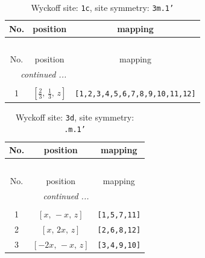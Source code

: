 \documentclass[fleqn,8pt]{jsarticle}
\begin{document}
\begin{longtable}{ccc}
\caption{Wyckoff site: {\tt 1c}, site symmetry: {\tt 3m.1'}}
 \\
 \hline \hline
No. & position & mapping \\ \hline \endfirsthead

\multicolumn{2}{l}{\tablename\ \thetable{}} \\
 \hline \hline
No. & position & mapping \\ \hline \endhead

 \hline \hline
\multicolumn{2}{r}{\footnotesize\it continued ...} \\ \endfoot

 \hline \hline
\multicolumn{2}{r}{} \\ \endlastfoot

1 & $\left[ \frac{2}{3},\, \frac{1}{3},\, z \right]$ & {\tt [1,2,3,4,5,6,7,8,9,10,11,12]} \\
\end{longtable}
\renewcommand{\arraystretch}{1.2}
\begin{longtable}{ccc}
\caption{Wyckoff site: {\tt 3d}, site symmetry: {\tt .m.1'}}
 \\
 \hline \hline
No. & position & mapping \\ \hline \endfirsthead

\multicolumn{2}{l}{\tablename\ \thetable{}} \\
 \hline \hline
No. & position & mapping \\ \hline \endhead

 \hline \hline
\multicolumn{2}{r}{\footnotesize\it continued ...} \\ \endfoot

 \hline \hline
\multicolumn{2}{r}{} \\ \endlastfoot

1 & $\left[ x,\, - x,\, z \right]$ & {\tt [1,5,7,11]} \\ \hline
2 & $\left[ x,\, 2 x,\, z \right]$ & {\tt [2,6,8,12]} \\ \hline
3 & $\left[ - 2 x,\, - x,\, z \right]$ & {\tt [3,4,9,10]} \\
\end{longtable}
\renewcommand{\arraystretch}{1.2}
\end{document}
